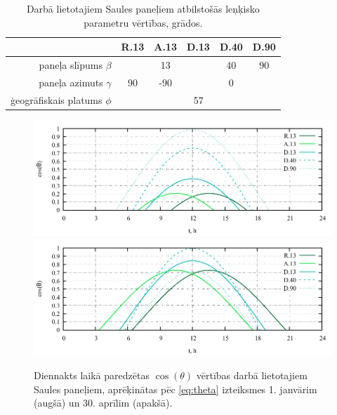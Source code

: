 \begin{table}[h!]
	\caption{Darbā lietotajiem Saules paneļiem atbilstošās leņķisko parametru vērtības, grādos.}
	\begin{center}
		\begin{tabular}{|r|c|c|c|c|c|}
			\hline
			         & R.13 & A.13 &   D.13   & D.40 & D.90 \\ \hline
			paneļa slīpums $\beta$  & \multicolumn{3}{c|}{13} &  40  &  90  \\ \hline
			paneļa azimuts $\gamma$ &  90  & -90  & \multicolumn{3}{c|}{0}  \\ \hline
			ģeogrāfiskais platums $\phi$  &        \multicolumn{5}{c|}{57}        \\ \hline
		\end{tabular}
	\end{center}
	\label{tab:param}
\end{table}

\begin{figure}[h]
	\centering
	\includegraphics[width=\linewidth]{figures/misc/cos-theta-jan.pdf}
	\includegraphics[width=\linewidth]{figures/misc/cos-theta-apr.pdf}
	\caption{Diennakts laikā paredzētas $\cos(\theta)$ vērtības darbā lietotajiem Saules paneļiem, aprēķinātas pēc \ref{eq:theta} izteiksmes 1. janvārim (augšā) un 30. aprīlim (apakšā).}
	\label{fig:cos-theta}
\end{figure}